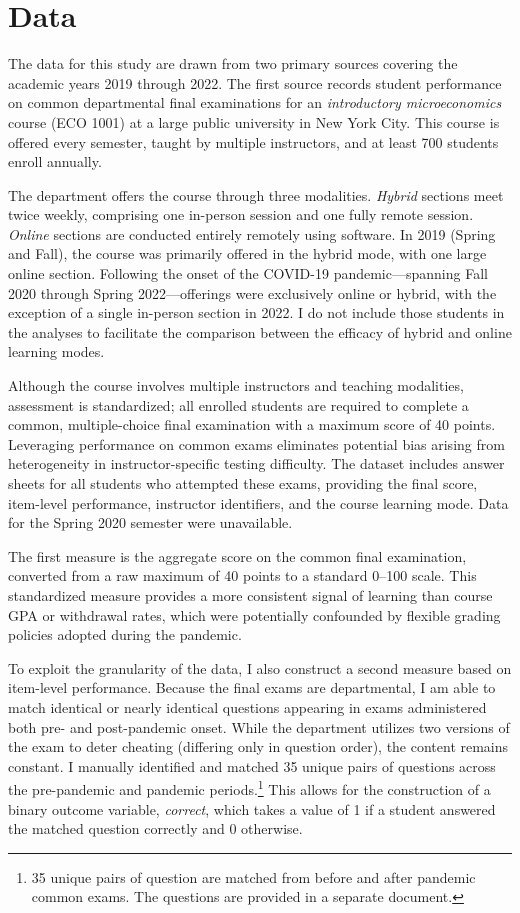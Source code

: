 \documentclass[
  12pt,
  letterpaper,
  DIV=11,
  numbers=noendperiod]{scrartcl}
\begin{document}
\section{Data}\label{data}

The data for this study are drawn from two primary sources covering the
academic years 2019 through 2022. The first source records student
performance on common departmental final examinations for an
\emph{introductory microeconomics} course (ECO 1001) at a large public
university in New York City. This course is offered every semester,
taught by multiple instructors, and at least 700 students enroll
annually.

The department offers the course through three modalities. \emph{Hybrid}
sections meet twice weekly, comprising one in-person session and one
fully remote session. \emph{Online} sections are conducted entirely
remotely using software. In 2019 (Spring and Fall), the course was
primarily offered in the hybrid mode, with one large online section.
Following the onset of the COVID-19 pandemic---spanning Fall 2020
through Spring 2022---offerings were exclusively online or hybrid, with
the exception of a single in-person section in 2022. I do not include
those students in the analyses to facilitate the comparison between the
efficacy of hybrid and online learning modes.

Although the course involves multiple instructors and teaching
modalities, assessment is standardized; all enrolled students are
required to complete a common, multiple-choice final examination with a
maximum score of 40 points. Leveraging performance on common exams
eliminates potential bias arising from heterogeneity in
instructor-specific testing difficulty. The dataset includes answer
sheets for all students who attempted these exams, providing the final
score, item-level performance, instructor identifiers, and the course
learning mode. Data for the Spring 2020 semester were unavailable.

The first measure is the aggregate score on the common final
examination, converted from a raw maximum of 40 points to a standard
0--100 scale. This standardized measure provides a more consistent
signal of learning than course GPA or withdrawal rates, which were
potentially confounded by flexible grading policies adopted during the
pandemic.

To exploit the granularity of the data, I also construct a second
measure based on item-level performance. Because the final exams are
departmental, I am able to match identical or nearly identical questions
appearing in exams administered both pre- and post-pandemic onset. While
the department utilizes two versions of the exam to deter cheating
(differing only in question order), the content remains constant. I
manually identified and matched 35 unique pairs of questions across the
pre-pandemic and pandemic periods.\footnote{35 unique pairs of question
  are matched from before and after pandemic common exams. The questions
  are provided in a separate document.} This allows for the construction
of a binary outcome variable, \emph{correct}, which takes a value of 1
if a student answered the matched question correctly and 0 otherwise.
\end{document}
